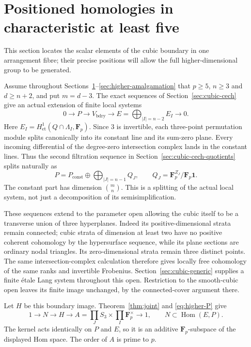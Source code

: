 \section{Positioned homologies in characteristic at least five}\label{sec:higher-homologies}
This section locates the scalar elements of the cubic boundary in one arrangement fibre; their precise positions will allow the full higher-dimensional group to be generated.

Assume throughout Sections~\ref{sec:higher-homologies}--\ref{sec:higher-amalgamation} that $p\ge5$, $n\ge3$ and $d\ge n+2$, and put $m=d-3$. The exact sequences of Section~\ref{sec:cubic-cech} give an actual extension of finite local systems
\begin{equation}\label{eq:higher-extension}
0\longrightarrow P\longrightarrow V_{\mathrm{bdry}}
 \longrightarrow E=\bigoplus_{|I|=n-2}E_I\longrightarrow0.
\end{equation}
Here $E_I=H^1_{\mathrm{et}}(Q\cap\Lambda_I,\mathbf F_p)$. Since $3$ is invertible, each three-point permutation module splits canonically into its constant line and its sum-zero plane. Every incoming differential of the degree-zero intersection complex lands in the constant lines. Thus the second filtration sequence in Section~\ref{sec:cubic-cech-quotients} splits naturally as
\begin{equation}\label{eq:higher-P}
P=P_{\mathrm{const}}\oplus\bigoplus_{|J|=n-1}Q_J,
\qquad Q_J=\mathbf F_p^{Z_J}/\mathbf F_p\mathbf1.
\end{equation}
The constant part has dimension $\binom mn$. This is a splitting of the actual local system, not just a decomposition of its semisimplification.

These sequences extend to the parameter open allowing the cubic itself to be a transverse union of three hyperplanes. Indeed its positive-dimensional strata remain connected; cubic strata of dimension at least two have no positive coherent cohomology by the hypersurface sequence, while its plane sections are ordinary nodal triangles. Its zero-dimensional strata remain three distinct points. The same intersection-complex calculation therefore gives locally free cohomology of the same ranks and invertible Frobenius. Section~\ref{sec:cubic-generic} supplies a finite \'etale Lang system throughout this open. Restriction to the smooth-cubic open leaves its finite image unchanged, by the connected-cover argument there.

Let $H$ be this boundary image. Theorem~\ref{thm:joint} and \eqref{eq:higher-P} give
\begin{equation}\label{eq:higher-group-extension}
1\longrightarrow N\longrightarrow H\longrightarrow
 A=\prod_J S_3\times\prod_I\mathbf F_p^\times\longrightarrow1,
\qquad N\subset\operatorname{Hom}(E,P).
\end{equation}
The kernel acts identically on $P$ and $E$, so it is an additive $\mathbf F_p$-subspace of the displayed Hom space. The order of $A$ is prime to $p$.

